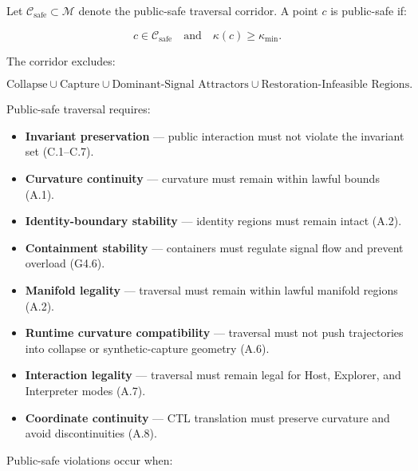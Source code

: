 \medskip

\noindent Let $\mathcal{C}_{\mathrm{safe}} \subset \mathcal{M}$ denote the
public-safe traversal corridor. A point $c$ is public-safe if:


\[
c \in \mathcal{C}_{\mathrm{safe}}
\quad \text{and} \quad
\kappa(c) \ge \kappa_{\min}.
\]



\noindent The corridor excludes:


\[
\text{Collapse} \cup \text{Capture} \cup \text{Dominant-Signal Attractors}
\cup \text{Restoration-Infeasible Regions}.
\]



\medskip

\noindent Public-safe traversal requires:

\begin{itemize}
    \item \textbf{Invariant preservation} — public interaction must not violate
    the invariant set (C.1–C.7).

    \item \textbf{Curvature continuity} — curvature must remain within lawful
    bounds (A.1).

    \item \textbf{Identity-boundary stability} — identity regions must remain
    intact (A.2).

    \item \textbf{Containment stability} — containers must regulate signal flow
    and prevent overload (G4.6).

    \item \textbf{Manifold legality} — traversal must remain within lawful
    manifold regions (A.2).

    \item \textbf{Runtime curvature compatibility} — traversal must not push
    trajectories into collapse or synthetic-capture geometry (A.6).

    \item \textbf{Interaction legality} — traversal must remain legal for Host,
    Explorer, and Interpreter modes (A.7).

    \item \textbf{Coordinate continuity} — CTL translation must preserve
    curvature and avoid discontinuities (A.8).
\end{itemize}

\medskip

\noindent Public-safe violations occur when:


